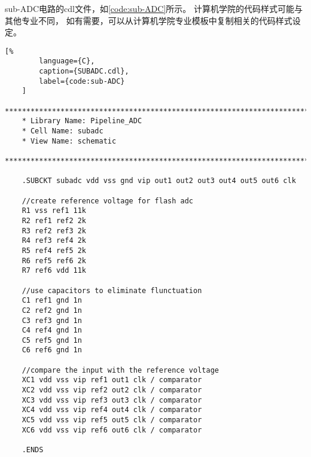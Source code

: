     \par sub-ADC电路的cdl文件，如\autoref{code:sub-ADC}所示。
    计算机学院的代码样式可能与其他专业不同，
    如有需要，可以从计算机学院专业模板中复制相关的代码样式设定。

    \begin{lstlisting}[%
        language={C},
        caption={SUBADC.cdl},
        label={code:sub-ADC}
    ]
    ********************************************************************************
    * Library Name: Pipeline_ADC
    * Cell Name: subadc
    * View Name: schematic
    ********************************************************************************

    .SUBCKT subadc vdd vss gnd vip out1 out2 out3 out4 out5 out6 clk

    //create reference voltage for flash adc
    R1 vss ref1 11k
    R2 ref1 ref2 2k
    R3 ref2 ref3 2k
    R4 ref3 ref4 2k
    R5 ref4 ref5 2k
    R6 ref5 ref6 2k
    R7 ref6 vdd 11k

    //use capacitors to eliminate flunctuation
    C1 ref1 gnd 1n
    C2 ref2 gnd 1n
    C3 ref3 gnd 1n
    C4 ref4 gnd 1n
    C5 ref5 gnd 1n
    C6 ref6 gnd 1n

    //compare the input with the reference voltage
    XC1 vdd vss vip ref1 out1 clk / comparator
    XC2 vdd vss vip ref2 out2 clk / comparator
    XC3 vdd vss vip ref3 out3 clk / comparator
    XC4 vdd vss vip ref4 out4 clk / comparator
    XC5 vdd vss vip ref5 out5 clk / comparator
    XC6 vdd vss vip ref6 out6 clk / comparator

    .ENDS
    \end{lstlisting}


